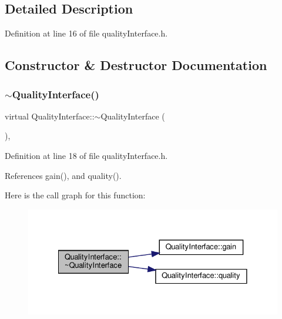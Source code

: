 \subsection{Detailed Description}


Definition at line 16 of file quality\+Interface.\+h.



\subsection{Constructor \& Destructor Documentation}
\mbox{\label{classQualityInterface_abe41a70c92a0b72dd9ff2a77fc9fdace}} 
\subsubsection{\texorpdfstring{$\sim$\+Quality\+Interface()}{~QualityInterface()}}
{\footnotesize\ttfamily virtual Quality\+Interface\+::$\sim$\+Quality\+Interface (\begin{DoxyParamCaption}{ }\end{DoxyParamCaption})\hspace{0.3cm}{\ttfamily [inline]}, {\ttfamily [virtual]}}



Definition at line 18 of file quality\+Interface.\+h.



References gain(), and quality().

Here is the call graph for this function\+:
\nopagebreak
\begin{figure}[H]
\begin{center}
\leavevmode
\includegraphics[width=328pt]{classQualityInterface_abe41a70c92a0b72dd9ff2a77fc9fdace_cgraph}
\end{center}
\end{figure}


